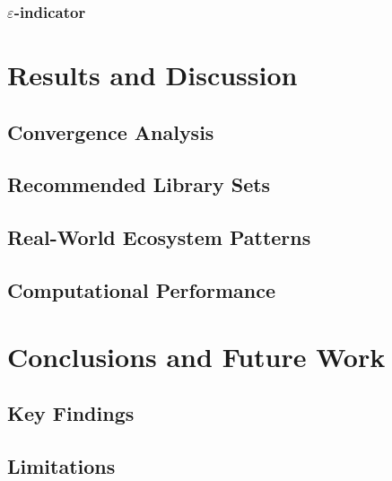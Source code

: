 \documentclass[runningheads]{llncs}
\begin{document}

\subsubsection{$\varepsilon$-indicator}


\section{Results and Discussion}

\subsection{Convergence Analysis}


\subsection{Recommended Library Sets}


\subsection{Real-World Ecosystem Patterns}


\subsection{Computational Performance}


\section{Conclusions and Future Work}

\subsection{Key Findings}


\subsection{Limitations}
\end{document}
